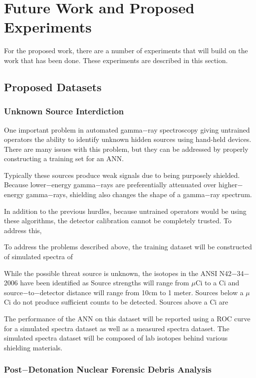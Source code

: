 \documentclass[tocnosub,noragright,centerchapter,12pt,fullpage]{uiucecethesis09}
\begin{document}
\chapter{Future Work and Proposed Experiments}

For the proposed work, there are a number of experiments that will build on the work that has been done. These experiments are described in this section.

\section{Proposed Datasets}

\subsection{Unknown Source Interdiction}

One important problem in automated gamma$-$ray spectroscopy giving untrained operators the ability to identify unknown hidden sources using hand-held devices. There are many issues with this problem, but they can be addressed by properly constructing a training set for an ANN.

Typically these sources produce weak signals due to being purposely shielded. Because lower$-$energy gamma$-$rays are preferentially attenuated over higher$-$energy gamma$-$rays, shielding also changes the shape of a gamma$-$ray spectrum. 

In addition to the previous hurdles, because untrained operators would be using these algorithms, the detector calibration cannot be completely trusted. To address this, 

To address the problems described above, the training dataset will be constructed of simulated spectra of 

While the possible threat source is unknown, the isotopes in the ANSI N42$-$34$-$2006 have been identified as 
Source strengths will range from $\mu$Ci to a Ci and source$-$to$-$detector distance will range from 10cm to 1 meter. Sources below a $\mu$Ci do not produce sufficient counts to be detected. Sources above a Ci are 

The performance of the ANN on this dataset will be reported using a ROC curve for a simulated spectra dataset as well as a measured spectra dataset. The simulated spectra dataset will be composed of lab isotopes behind various shielding materials. 


\subsection{Post$-$Detonation Nuclear Forensic Debris Analysis}
\end{document}
